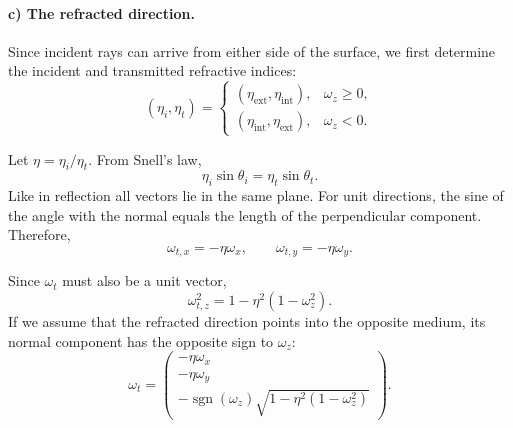 \paragraph{c) The refracted direction.}

Since incident rays can arrive from either side of the surface,
we first determine the incident and transmitted refractive indices:
\[
(\eta_i,\eta_t)=
\begin{cases}
(\eta_{\mathrm{ext}},\eta_{\mathrm{int}}), & \omega_z\geq 0,\\
(\eta_{\mathrm{int}},\eta_{\mathrm{ext}}), & \omega_z<0.
\end{cases}
\]

Let $\eta=\eta_i/\eta_t$. From Snell's law,
\[
    \eta_i\sin\theta_i=\eta_t\sin\theta_t.
\]
Like in reflection all vectors lie in the same plane.
For unit directions, the sine of the angle with the normal
equals the length of the perpendicular component. Therefore,
\[
    \omega_{t,x}=-\eta\omega_x,\qquad
    \omega_{t,y}=-\eta\omega_y.
\]

Since $\omega_t$ must also be a unit vector,
\[
    \omega_{t,z}^2=1-\eta^2(1-\omega_z^2).
\]
If we assume that the refracted direction points into the opposite medium,
its normal component has the opposite sign to $\omega_z$:
\[
\omega_t=
\begin{pmatrix}
-\eta\omega_x\\
-\eta\omega_y\\
-\operatorname{sgn}(\omega_z)
\sqrt{1-\eta^2(1-\omega_z^2)}
\end{pmatrix}.
\]
